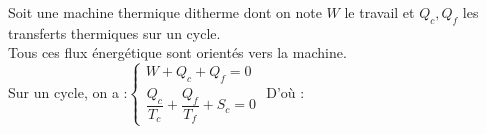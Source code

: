 \documentclass[a4paper]{article}
\begin{document}
\pagestyle{fancy}
\fancyhf{}
\setlength{\headheight}{15pt}

\begin{center}
	\large{}
\end{center}


Soit une machine thermique ditherme dont on note \(W\) le travail et \(Q_c,Q_f\) les transferts thermiques sur un cycle.\\
Tous ces flux énergétique sont orientés vers la machine.\\
Sur un cycle, on a :\(\left\lbrace\begin{array}{ll}W+Q_c+Q_f=0\\\dfrac{Q_c}{T_c}+\dfrac{Q_f}{T_f}+S_c=0\end{array}\right.\)
D'où :\begin{center}\end{center}
\end{document}
